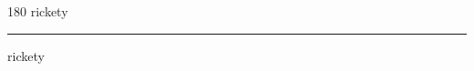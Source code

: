 
\begin{frame}
\begin{center}
\begin{turn}{180}
{\fontsize{2.5cm}{1em}\selectfont rickety}
\end{turn}
\vspace{1em}\par  
\hrule
\vspace{1em}\par  
{\fontsize{2.5cm}{1em}\selectfont rickety}
\end{center}
\end{frame}
